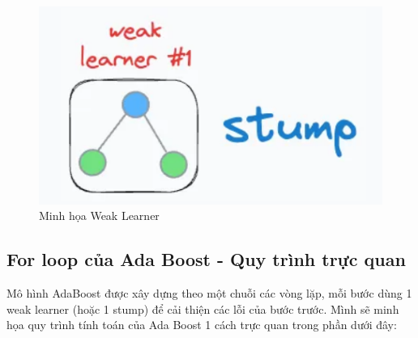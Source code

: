 \documentclass[11pt]{article}
\begin{document}
\begin{figure}[H]
    \centering
    \includegraphics[width=0.3\linewidth]{images/weak.png}
    \caption{Minh họa Weak Learner}
\end{figure}

\subsection{For loop của Ada Boost - Quy trình trực quan}
Mô hình AdaBoost được xây dựng theo một chuỗi các vòng lặp, mỗi bước dùng 1 weak learner (hoặc 1 stump) để cải thiện các lỗi của bước trước. Mình sẽ minh họa quy trình tính toán của Ada Boost 1 cách trực quan trong phần dưới đây:
\end{document}
